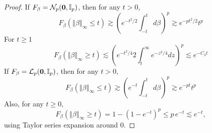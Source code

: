 \documentclass[10pt,a4paper]{amsart}
\newcommand{\norm}[1]{\left\Vert#1\right\Vert}
\begin{document}
\begin{proof}
If $F_\beta= \mathcal{N}_p ({\bf 0}, \mathbb{I}_p)$, then for any $t>0$,
\begin{equation*}
    F_\beta(\norm{\beta}_\infty \le t) \gtrsim \left (e^{- t^2/2} \int_{-t}^t d\beta \right )^p \gtrsim e^{-p t^2 / 2}t^p
\end{equation*}
For $t \ge 1$
\begin{equation*}
    F_\beta(\norm{\beta}_\infty \ge t) \lesssim  \left (e^{-t^2/4} 2\int_{t}^\infty e^{-z^2/4} dz \right )^p \lesssim e^{-C_3t}
\end{equation*}
If $F_\beta = \mathcal{L}_p ({\bf 0}, \mathbb{I}_p)$, then for any $t > 0$,
\begin{equation*}
    F_\beta(\norm{\beta}_\infty \le t) \gtrsim \left (e^{- t} \int_{-t}^t d\beta \right )^p \gtrsim e^{-p t}t^p
\end{equation*}
Also, for any $t \ge 0$,
\begin{equation*}
    F_\beta(\norm{\beta}_\infty \ge t)
    = 1 - \left(1 - e^{-t}\right)^p
    \le p\, e^{-t}
    \lesssim e^{-t},
\end{equation*}
using Taylor series expansion around $0$.
\end{proof}
\end{document}
